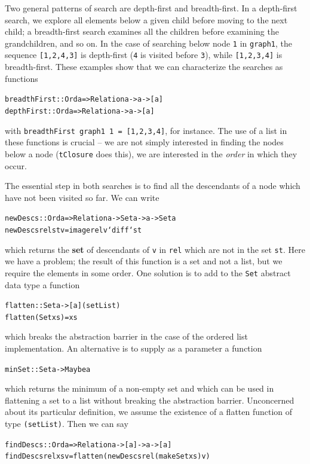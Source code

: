 Two general patterns of search are depth-first and breadth-first. In a
depth-first search, we explore all elements below a given child before moving
to the next child; a breadth-first search examines all the children before
examining the grandchildren, and so on. In the case of searching below node
\texttt{1} in \texttt{graph1}, the sequence \texttt{[1,2,4,3]} is depth-first (\texttt{4}
is visited before \texttt{3}), while \texttt{[1,2,3,4]} is breadth-first. These
examples show that we can characterize the searches as functions
\begin{alltt}
breadthFirst :: Ord a => Relation a -> a -> [a]
depthFirst   :: Ord a => Relation a -> a -> [a]
\end{alltt}
with  \texttt{breadthFirst graph1 1 = [1,2,3,4]}, for instance. The use of a
list in these functions is crucial -- we are not simply interested in
finding the nodes below a node (\texttt{tClosure} does this), we are interested
in the {\em order\/} in which they occur.

The essential step in both searches is to find all the descendants of a node which
have not been visited so far. We can write
\begin{alltt}
newDescs :: Ord a => Relation a -> Set a -> a -> Set a
newDescs rel st v = image rel v `diff` st
\end{alltt}
which returns the \textbf{set} of descendants of \texttt{v} in \texttt{rel} which
are not in the set \texttt{st}. Here we have a problem; the result of this
function is a set and not a list, but we require the elements in some order.
One solution is to add to the \texttt{Set} abstract data type a function
\begin{alltt}
flatten :: Set a -> [a]\hfill (setList)
flatten (Set xs) = xs
\end{alltt}
which breaks the abstraction barrier in the case of the ordered list
implementation. An alternative is to supply as a parameter a function
\begin{alltt}
minSet :: Set a -> Maybe a
\end{alltt}
which returns the minimum of a non-empty set
and which can be used in flattening a set to a list without breaking the
abstraction barrier. Unconcerned about its particular definition, we assume the existence
of a flatten function of type \texttt{(setList)}. Then we can say
\begin{alltt}
findDescs :: Ord a => Relation a -> [a] -> a -> [a]
findDescs rel xs v = flatten (newDescs rel (makeSet xs) v)
\end{alltt}

